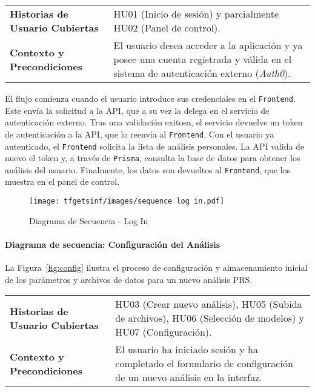 \begin{table}[H]
    \centering
    \small
    \begin{tabular}{|p{6cm}|p{8cm}|}
        \hline
        \textbf{Historias de Usuario Cubiertas} & HU01 (Inicio de sesión) y parcialmente HU02 (Panel de control). \\
        \textbf{Contexto y Precondiciones} & El usuario desea acceder a la aplicación y ya posee una cuenta registrada y válida en el sistema de autenticación externo (\textit{Auth0}). \\
        \hline
    \end{tabular}
\end{table}

El flujo comienza cuando el usuario introduce sus credenciales en el \texttt{Frontend}. Este envía la solicitud a la API, que a su vez la delega en el servicio de autenticación externo. Tras una validación exitosa, el servicio devuelve un token de autenticación a la API, que lo reenvía al \texttt{Frontend}. Con el usuario ya autenticado, el \texttt{Frontend} solicita la lista de análisis personales. La API valida de nuevo el token y, a través de \texttt{Prisma}, consulta la base de datos para obtener los análisis del usuario. Finalmente, los datos son devueltos al \texttt{Frontend}, que los muestra en el panel de control.

\begin{figure}[H]
    \centering
    \texttt{[image: tfgetsinf/images/sequence log in.pdf]}
    \caption{Diagrama de Secuencia - Log In}
    \label{fig:login}
\end{figure}

\paragraph{Diagrama de secuencia: Configuración del Análisis}
La Figura~\ref{fig:config} ilustra el proceso de configuración y almacenamiento inicial de los parámetros y archivos de datos para un nuevo análisis PRS.

\begin{table}[H]
    \centering
    \small
    \begin{tabular}{|p{6cm}|p{8cm}|}
        \hline
        \textbf{Historias de Usuario Cubiertas} & HU03 (Crear nuevo análisis), HU05 (Subida de archivos), HU06 (Selección de modelos) y HU07 (Configuración). \\
        \textbf{Contexto y Precondiciones} & El usuario ha iniciado sesión y ha completado el formulario de configuración de un nuevo análisis en la interfaz. \\
        \hline
    \end{tabular}
\end{table}


